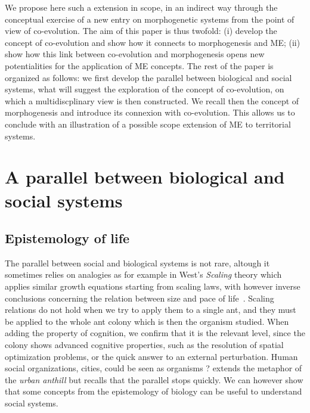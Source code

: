 \documentclass[letterpaper]{article}
\begin{document}
We propose here such a extension in scope, in an indirect way through the conceptual exercise of a new entry on morphogenetic systems from the point of view of co-evolution. The aim of this paper is thus twofold: (i) develop the concept of co-evolution and show how it connects to morphogenesis and ME; (ii) show how this link between co-evolution and morphogenesis opens new potentialities for the application of ME concepts. The rest of the paper is organized as follows: we first develop the parallel between biological and social systems, what will suggest the exploration of the concept of co-evolution, on which a multidiscplinary view is then constructed. We recall then the concept of morphogenesis and introduce its connexion with co-evolution. This allows us to conclude with an illustration of a possible scope extension of ME to territorial systems.



\section{A parallel between biological and social systems}


\subsection{Epistemology of life}

The parallel between social and biological systems is not rare, altough it sometimes relies on analogies as for example in West's \emph{Scaling} theory which applies similar growth equations starting from scaling laws, with however inverse conclusions concerning the relation between size and pace of life~\citep{bettencourt2007growth}. Scaling relations do not hold when we try to apply them to a single ant, and they must be applied to the whole ant colony which is then the organism studied. When adding the property of cognition, we confirm that it is the relevant level, since the colony shows advanced cognitive properties, such as the resolution of spatial optimization problems, or the quick answer to an external perturbation. Human social organizations, cities, could be seen as organisms ? \cite{banos2013pour} extends the metaphor of the \emph{urban anthill} but recalls that the parallel stops quickly. We can however show that some concepts from the epistemology of biology can be useful to understand social systems.
\end{document}

